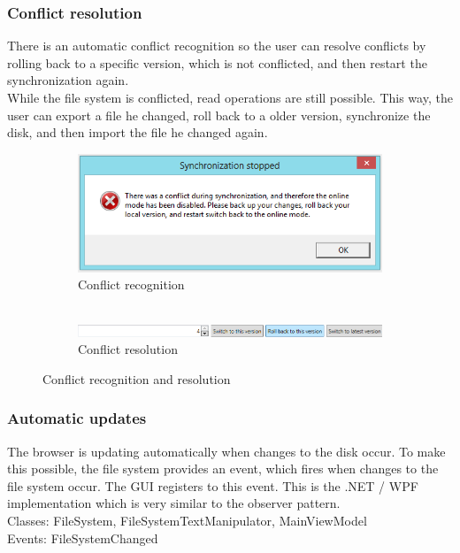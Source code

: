 \documentclass[JCDReport.tex]{subfiles}
\begin{document}
\subsubsection{Conflict resolution}
There is an automatic conflict recognition so the user can resolve conflicts by rolling back to a specific version, which is not conflicted, and then restart the synchronization again.\\
While the file system is conflicted, read operations are still possible. This way, the user can export a file he changed, roll back to a older version, synchronize the disk, and then import the file he changed again.

\begin{figure}[h!]
	\begin{subfigure}[b]{1\textwidth}
		\centering
		\includegraphics[scale=1]{Images/synchronization_conflict1.png}
		\caption{Conflict recognition\\\ \\} %
	\end{subfigure}
	
	\begin{subfigure}[b]{1\textwidth}
		\centering
		\includegraphics[scale=0.75]{Images/synchronization_conflict2.png}
		\caption{Conflict resolution}
	\end{subfigure}
	\caption{Conflict recognition and resolution}
\end{figure}


\subsubsection{Automatic updates}
The browser is updating automatically when changes to the disk occur. To make this possible, the file system provides an event, which fires when changes to the file system occur. The GUI registers to this event. This is the .NET / WPF implementation which is very similar to the observer pattern.\\
Classes: FileSystem, FileSystemTextManipulator, MainViewModel\\
Events: FileSystemChanged
\end{document}
